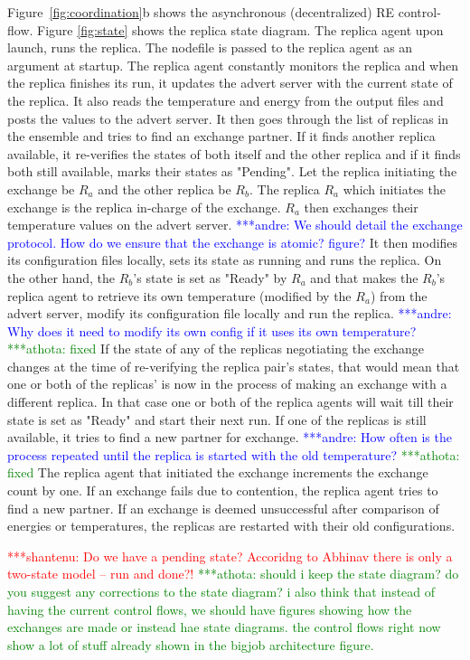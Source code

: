 \documentclass{rspublic}
\newcommand{\jhanote}[1]{ {\textcolor{red} { ***shantenu: #1 }}}
\newcommand{\alnote}[1]{ {\textcolor{blue} { ***andre: #1 }}}
\newcommand{\athotanote}[1]{ {\textcolor{green} { ***athota: #1 }}}
\newcommand{\alnote}[1]{}
\newcommand{\athotanote}[1]{}
\newcommand{\jhanote}[1]{}
\begin{document}
Figure~\ref{fig:coordination}b shows the asynchronous (decentralized) RE
control-flow. Figure \ref{fig:state} shows the replica state diagram. The replica agent upon launch, runs the replica. The nodefile is passed to the replica agent as an argument at startup. The replica agent constantly monitors the replica and when the replica finishes its run, it updates the advert server with
the current state of the replica. It also reads the temperature and
energy from the output files and posts the values to the advert
server. It then goes through the list of replicas in the ensemble and tries to find an
exchange partner. If it finds another replica available, it
re-verifies the states of both itself and the other replica and if it
finds both still available, marks their states as "Pending". Let the replica initiating the exchange be $R_a$ and the other replica be $R_b$.
The replica $R_a$ which initiates the exchange is the replica in-charge of the exchange. $R_a$
then exchanges their temperature values on the advert server.  \alnote{We
  should detail the exchange protocol. How do we ensure that the
  exchange is atomic? figure?}  It then modifies its configuration
files locally, sets its state as running and runs the replica. On the
other hand, the $R_b$'s state is set as "Ready" by $R_a$ and that
makes the $R_b$'s replica agent to retrieve its own
temperature (modified by the $R_a$) from the advert server, modify its configuration file
locally and run the replica. \alnote{Why does it need to modify its
  own config if it uses its own temperature?} \athotanote{fixed} If the state of any of the replicas negotiating the exchange changes at the time of re-verifying the replica pair's states, that would mean that one or both of the replicas' is now in the process of making an exchange with a different replica. In that case one or both of the replica agents will wait till their state is set as "Ready" and start their next run. If one of the replicas is still available, it tries to find a new partner for exchange.  \alnote{How often is the process repeated until the replica
  is started with the old temperature?} \athotanote{fixed}The replica agent that
initiated the exchange increments the exchange count by one.
If an exchange fails due to contention, the replica agent tries to find a new partner. If an exchange is deemed unsuccessful after comparison of energies or temperatures, the replicas are restarted with their old configurations. 

\jhanote{Do we have a pending state? Accoridng to Abhinav there is
  only a two-state model -- run and done?!} \athotanote{should i keep the state diagram? do you suggest any corrections to the state diagram? i also think that instead of having the current control flows, we should have figures showing how the exchanges are made or instead hae state diagrams. the control flows right now show a lot of stuff already shown in the bigjob architecture figure. }
  
\end{document}

